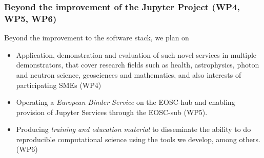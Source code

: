 \subsubsection{Beyond the improvement of the Jupyter Project (WP4,
  WP5, WP6)}
Beyond the improvement to the software stack, we plan on
\begin{itemize}
\item Application, demonstration and evaluation of such novel services
  in multiple demonstrators, that cover research fields such as
  health, astrophysics, photon and neutron science, geosciences and
  mathematics, and also interests of participating SMEs (WP4)
\item Operating a \emph{European Binder Service} on the EOSC-hub and
  enabling provision of Jupyter Services through the EOSC-sub (WP5).
\item Producing \emph{training and education material} to disseminate
  the ability to do reproducible computational science using the tools
  we develop, among others. (WP6)
\end{itemize}


\clearpage

